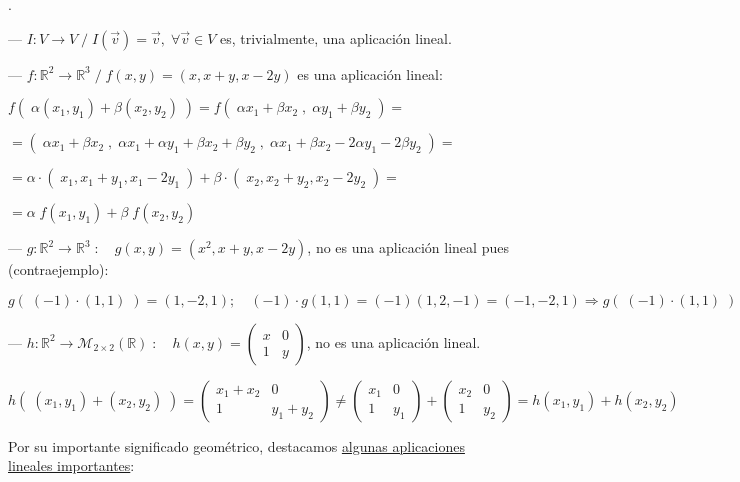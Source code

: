 \begin{ejem}.
	
\noindent --- $I:V\to V\; / \; I(\vec v)=\vec v,\; \forall \vec v \in V$ es, trivialmente, una aplicación lineal.

\noindent --- $f:\mathbb R^2 \to \mathbb R^3\; / \; f(x,y)=(x,x+y,x-2y)$ es una aplicación lineal:

\noindent $ f(\; \alpha(x_1,y_1)+\beta(x_2,y_2)\; )= f(\; \alpha x_1+\beta x_2\; , \; \alpha y_1+\beta y_2\; ) =$

\noindent $= (\; \alpha x_1 + \beta x_2 \; , \; \alpha x_1+\alpha y_1 + \beta x_2 + \beta y_2 \; , \; \alpha x_1+\beta x_2-2\alpha y_1 - 2 \beta y_2\; )=   $

\noindent $=\alpha\cdot (\; x_1, x_1+y_1, x_1-2y_1 \;)  +\beta \cdot (\; x_2, x_2+y_2, x_2-2y_2 \;) = $

\noindent $=\alpha \; f(x_1,y_1)+\beta \; f(x_2,y_2) $

\noindent --- $g:\mathbb R^2 \to \mathbb R^3 \; :\quad g(x,y)=(x^2, x+y,x-2y)$, no es una aplicación lineal pues (contraejemplo):

\noindent $g(\;(-1)\cdot (1,1) \;)= (1,-2,1); \quad (-1)\cdot g(1,1)=(-1)(1,2,-1)=(-1,-2,1) \Rightarrow g(\;(-1)\cdot (1,1) \;) \neq (-1)\cdot g(1,1)$

\noindent --- $h: \mathbb R^2 \to \mathcal M_{2 \times 2}(\mathbb R)\; : \quad h(x,y)=\left( \begin{matrix} x&0\\1&y \end{matrix} \right)$, no es una aplicación lineal.

\noindent $h(\; (x_1,y_1)+(x_2,y_2)\; )=\left( \begin{matrix} x _1+x_2&0\\1&y_1+y_2 \end{matrix} \right) \neq \left( \begin{matrix} x _1&0\\1&y_1 \end{matrix} \right) + \left( \begin{matrix} x_2&0\\1&y_2 \end{matrix} \right)=h(x_1,y_1)+h(x_2,y_2)$

\end{ejem}

Por su importante significado geométrico, destacamos \underline{algunas aplicaciones} \underline{lineales importantes}:

